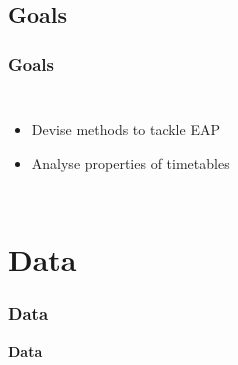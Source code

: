 \documentclass[]{beamer}
\begin{document}
        \subsection{Goals}
        \begin{frame}
            \frametitle{Goals}
			\begin{columns}[c]
            \column{2.7in}
		        \begin{itemize}
	                \item Devise methods to tackle EAP
		            \item Analyse properties of timetables
	            \end{itemize}
            \column{2.3in}
	        \end{columns}
        \end{frame}  
            
    \section{Data}
    \begin{frame}
        \frametitle{Data}
        \begin{center}
            \textcolor{red!80!black}{\textbf{Data}}
        \end{center}
    \end{frame}
    
\end{document}

